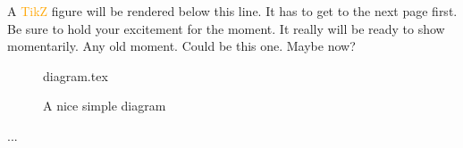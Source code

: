 \documentclass[float=false, crop=false]{standalone}
\begin{document}
A \textcolor{orange}{TikZ}
 figure will be rendered below this line. It has to get to the next page first. Be sure to hold your excitement for the moment. It really will be ready to show momentarily. Any old moment. Could be this one. Maybe now? 
 \begin{figure}[ht]
 {diagram.tex}
 \label{fig:tikzexample}
\caption{A nice simple diagram}
\end{figure}
 ...
\end{document}
